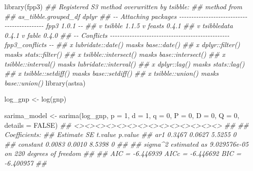 \documentclass[
  letterpaper,
  DIV=11,
  numbers=noendperiod]{scrartcl}
\newenvironment{Shaded}{\begin{snugshade}}{\end{snugshade}}
\newcommand{\AttributeTok}[1]{\textcolor[rgb]{0.40,0.45,0.13}{#1}}
\newcommand{\ConstantTok}[1]{\textcolor[rgb]{0.56,0.35,0.01}{#1}}
\newcommand{\DecValTok}[1]{\textcolor[rgb]{0.68,0.00,0.00}{#1}}
\newcommand{\DocumentationTok}[1]{\textcolor[rgb]{0.37,0.37,0.37}{\textit{#1}}}
\newcommand{\FunctionTok}[1]{\textcolor[rgb]{0.28,0.35,0.67}{#1}}
\newcommand{\NormalTok}[1]{\textcolor[rgb]{0.00,0.23,0.31}{#1}}
\newcommand{\OtherTok}[1]{\textcolor[rgb]{0.00,0.23,0.31}{#1}}
\begin{document}
\begin{Shaded}
\begin{Highlighting}[]
\FunctionTok{library}\NormalTok{(fpp3)}
\DocumentationTok{\#\# Registered S3 method overwritten by \textquotesingle{}tsibble\textquotesingle{}:}
\DocumentationTok{\#\#   method               from }
\DocumentationTok{\#\#   as\_tibble.grouped\_df dplyr}
\DocumentationTok{\#\# {-}{-} Attaching packages {-}{-}{-}{-}{-}{-}{-}{-}{-}{-}{-}{-}{-}{-}{-}{-}{-}{-}{-}{-}{-}{-}{-}{-}{-}{-}{-}{-}{-}{-}{-}{-}{-}{-}{-}{-}{-}{-}{-}{-}{-}{-}{-}{-} fpp3 1.0.1 {-}{-}}
\DocumentationTok{\#\# v tsibble     1.1.5     v feasts      0.4.1}
\DocumentationTok{\#\# v tsibbledata 0.4.1     v fable       0.4.0}
\DocumentationTok{\#\# {-}{-} Conflicts {-}{-}{-}{-}{-}{-}{-}{-}{-}{-}{-}{-}{-}{-}{-}{-}{-}{-}{-}{-}{-}{-}{-}{-}{-}{-}{-}{-}{-}{-}{-}{-}{-}{-}{-}{-}{-}{-}{-}{-}{-}{-}{-}{-}{-}{-}{-}{-}{-} fpp3\_conflicts {-}{-}}
\DocumentationTok{\#\# x lubridate::date()    masks base::date()}
\DocumentationTok{\#\# x dplyr::filter()      masks stats::filter()}
\DocumentationTok{\#\# x tsibble::intersect() masks base::intersect()}
\DocumentationTok{\#\# x tsibble::interval()  masks lubridate::interval()}
\DocumentationTok{\#\# x dplyr::lag()         masks stats::lag()}
\DocumentationTok{\#\# x tsibble::setdiff()   masks base::setdiff()}
\DocumentationTok{\#\# x tsibble::union()     masks base::union()}
\FunctionTok{library}\NormalTok{(astsa)}

\NormalTok{log\_gnp }\OtherTok{\textless{}{-}} \FunctionTok{log}\NormalTok{(gnp)}

\NormalTok{sarima\_model }\OtherTok{\textless{}{-}} \FunctionTok{sarima}\NormalTok{(log\_gnp, }\AttributeTok{p =} \DecValTok{1}\NormalTok{, }\AttributeTok{d =} \DecValTok{1}\NormalTok{, }\AttributeTok{q =} \DecValTok{0}\NormalTok{, }\AttributeTok{P =} \DecValTok{0}\NormalTok{, }\AttributeTok{D =} \DecValTok{0}\NormalTok{, }\AttributeTok{Q =} \DecValTok{0}\NormalTok{, }\AttributeTok{details =} \ConstantTok{FALSE}\NormalTok{)}
\DocumentationTok{\#\# \textless{}\textgreater{}\textless{}\textgreater{}\textless{}\textgreater{}\textless{}\textgreater{}\textless{}\textgreater{}\textless{}\textgreater{}\textless{}\textgreater{}\textless{}\textgreater{}\textless{}\textgreater{}\textless{}\textgreater{}\textless{}\textgreater{}\textless{}\textgreater{}\textless{}\textgreater{}\textless{}\textgreater{}}
\DocumentationTok{\#\#  }
\DocumentationTok{\#\# Coefficients: }
\DocumentationTok{\#\#          Estimate     SE t.value p.value}
\DocumentationTok{\#\# ar1        0.3467 0.0627  5.5255       0}
\DocumentationTok{\#\# constant   0.0083 0.0010  8.5398       0}
\DocumentationTok{\#\# }
\DocumentationTok{\#\# sigma\^{}2 estimated as 9.029576e{-}05 on 220 degrees of freedom }
\DocumentationTok{\#\#  }
\DocumentationTok{\#\# AIC = {-}6.446939  AICc = {-}6.446692  BIC = {-}6.400957 }
\DocumentationTok{\#\# }


\end{Highlighting}
\end{Shaded}
\end{document}
